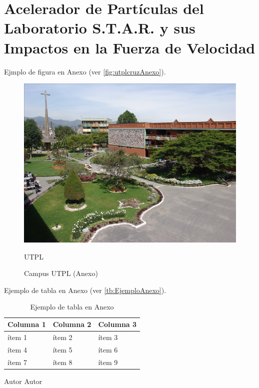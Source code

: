 %
%
%
\chapter{Acelerador de Partículas del Laboratorio S.T.A.R. y sus Impactos en la Fuerza de Velocidad}

\Blindtext

Ejmplo de figura en Anexo (ver \autoref{fig:utplcruzAnexo}). 

\begin{figure}[h!]
	\centering
	\captionsetup{width=0.7\textwidth}
	\includegraphics[width=0.7\linewidth]{FIGURES/UTPL_cruz}
	\caption{Campus UTPL (Anexo) \vspace{-5pt}}
	\FigExtraCaptionUTPL 			%
	{\cite{utpl2008campus}}		%
	{UTPL}			%
	\label{fig:utplcruzAnexo}
\end{figure}

Ejemplo de tabla en Anexo (ver \autoref{tb:EjemploAnexo}).

\begin{table}[h!]
	\centering
	\captionsetup{width=0.44\textwidth}
	\caption{Ejemplo de tabla en Anexo}
	\label{tb:EjemploAnexo}
	\begin{tabular}{|l|l|l|}
		\hline
		\textbf{Columna 1} & \textbf{Columna 2} & \textbf{Columna 3} \\ \hline
		ítem 1             & ítem 2             & ítem 3             \\ \hline
		ítem 4             & ítem 5             & ítem 6             \\ \hline
		ítem 7             & ítem 8             & ítem 9             \\ \hline
	\end{tabular}
	\vspace{3pt}
	\FigExtraCaptionUTPL		%
	{Autor}					%
	{Autor} 				%
\end{table}

